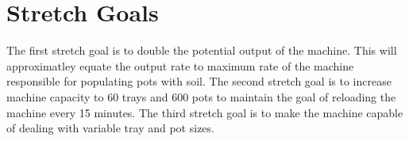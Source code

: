 \documentclass{article}
\begin{document}
\section{Stretch Goals}
The first stretch goal is to double the potential output of the machine. This will approximatley equate the output rate to maximum rate of the
machine responsible for populating pots with soil. The second stretch goal is to increase machine capacity to 60 trays and 600 pots to
maintain the goal of reloading the machine every 15 minutes. The third stretch goal is to make the machine capable of dealing with variable
tray and pot sizes.
\end{document}

